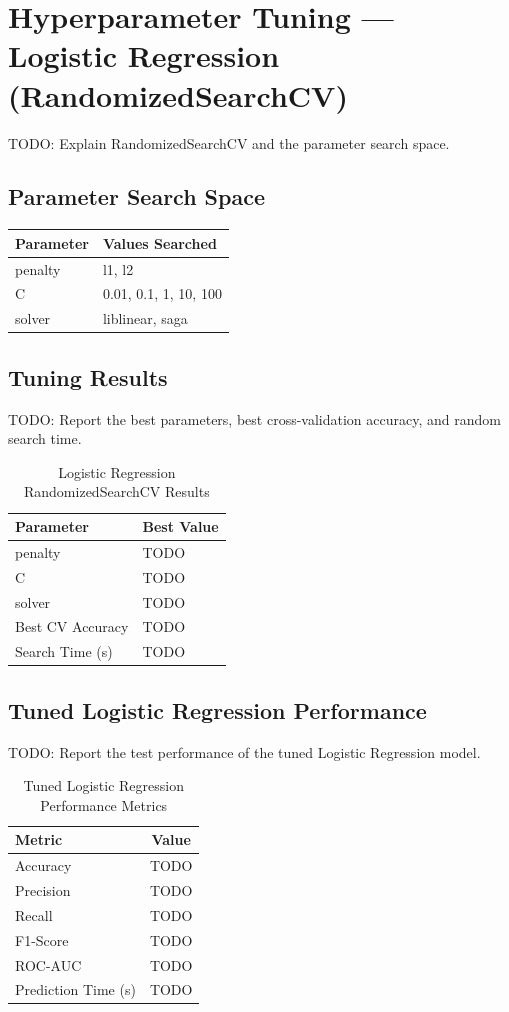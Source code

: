 \documentclass[12pt,a4paper]{article}
\begin{document}
\section{Hyperparameter Tuning — Logistic Regression (RandomizedSearchCV)}
TODO: Explain RandomizedSearchCV and the parameter search space.

\subsection{Parameter Search Space}
\begin{longtable}{|l|l|}
\hline
\textbf{Parameter} & \textbf{Values Searched} \\ \hline
penalty & l1, l2 \\ \hline
C & 0.01, 0.1, 1, 10, 100 \\ \hline
solver & liblinear, saga \\ \hline
\end{longtable}

\subsection{Tuning Results}
TODO: Report the best parameters, best cross-validation accuracy, and random search time.

\begin{table}[H]
\centering
\begin{tabular}{ll}
\toprule
\textbf{Parameter} & \textbf{Best Value} \\ \midrule
penalty & TODO \\
C & TODO \\
solver & TODO \\
Best CV Accuracy & TODO \\
Search Time (s) & TODO \\
\bottomrule
\end{tabular}
\caption{Logistic Regression RandomizedSearchCV Results}
\end{table}

\subsection{Tuned Logistic Regression Performance}
TODO: Report the test performance of the tuned Logistic Regression model.

\begin{table}[H]
\centering
\begin{tabular}{lc}
\toprule
\textbf{Metric} & \textbf{Value} \\ \midrule
Accuracy & TODO \\
Precision & TODO \\
Recall & TODO \\
F1-Score & TODO \\
ROC-AUC & TODO \\
Prediction Time (s) & TODO \\
\bottomrule
\end{tabular}
\caption{Tuned Logistic Regression Performance Metrics}
\end{table}
\end{document}
